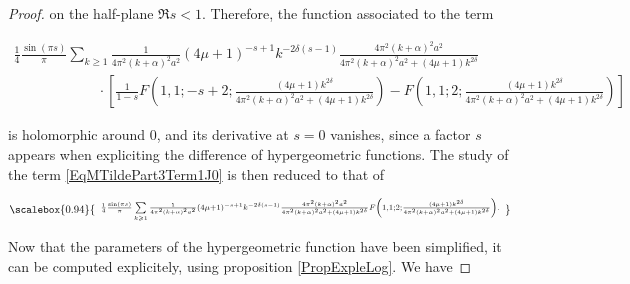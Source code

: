 \documentclass{jams-l}
\theoremstyle{definition}
\theoremstyle{remark}
\numberwithin{equation}{section}
\newcommand\scalemath[2]{\scalebox{#1}{\mbox{\ensuremath{\displaystyle #2}}}}
\begin{document}
\begin{proof}
                        \noindent on the half-plane $\Re s < 1$. Therefore, the function associated to the term
                        
                        \[ \begin{array}{l}
                                \scriptstyle \frac{1}{4} \frac{\sin \left( \pi s \right)}{\pi} \sum\limits_{k \geqslant 1} \frac{1}{4 \pi^2 \left( k + \alpha \right)^2 a^2} \left( 4 \mu + 1 \right)^{-s+1} k^{-2 \delta \left( s-1 \right)} \frac{4 \pi^2 \left( k + \alpha \right)^2 a^2}{4 \pi^2 \left( k + \alpha \right)^2 a^2 + \left( 4 \mu + 1 \right) k^{2 \delta}} \\[1.2em] 
                                
                                \qquad \qquad \qquad \scriptstyle \cdot \left[ \frac{1}{1-s} F \left( 1, 1; -s+2; \frac{\left( 4 \mu + 1 \right) k^{2 \delta}}{4 \pi^2 \left( k + \alpha \right)^2 a^2 + \left( 4 \mu + 1 \right) k^{2 \delta}} \right) - F \left( 1, 1; 2; \frac{\left( 4 \mu + 1 \right) k^{2 \delta}}{4 \pi^2 \left( k + \alpha \right)^2 a^2 + \left( 4 \mu + 1 \right) k^{2 \delta}} \right) \right]
                            \end{array} \]
                        
                        \noindent is holomorphic around $0$, and its derivative at $s=0$ vanishes, since a factor $s$ appears when expliciting the difference of hypergeometric functions. The study of the term \eqref{EqMTildePart3Term1J0} is then reduced to that of
                        
                        \[ \scalemath{0.94}{\begin{array}{c}
                                \scriptstyle \frac{1}{4} \frac{\sin \left( \pi s \right)}{\pi} \sum\limits_{k \geqslant 1} \frac{1}{4 \pi^2 \left( k + \alpha \right)^2 a^2} \left( 4 \mu + 1 \right)^{-s+1} k^{-2 \delta \left( s-1 \right)} \frac{4 \pi^2 \left( k + \alpha \right)^2 a^2}{4 \pi^2 \left( k + \alpha \right)^2 a^2 + \left( 4 \mu + 1 \right) k^{2 \delta}} F \left( 1, 1; 2; \frac{\left( 4 \mu + 1 \right) k^{2 \delta}}{4 \pi^2 \left( k + \alpha \right)^2 a^2 + \left( 4 \mu + 1 \right) k^{2 \delta}} \right).
                            \end{array}} \]
                        
                        \noindent Now that the parameters of the hypergeometric function have been simplified, it can be computed explicitely, using proposition \ref{PropExpleLog}. We have
                        

\end{proof}
\end{document}
